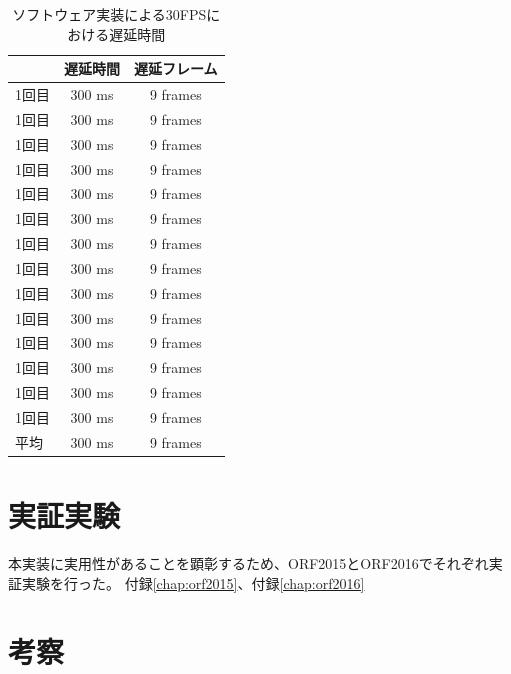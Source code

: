 \begin{table}[htbp]
  \caption{ソフトウェア実装による30FPSにおける遅延時間}
  \label{tb:pg235-vin-axi4-stream}
  \begin{center}
  \begin{tabular}{l|c|c}
    \hline
         & 遅延時間  & 遅延フレーム \\\hline\hline
    1回目 & 300 ms  & 9 frames \\\hline
    1回目 & 300 ms  & 9 frames \\\hline
    1回目 & 300 ms  & 9 frames \\\hline
    1回目 & 300 ms  & 9 frames \\\hline
    1回目 & 300 ms  & 9 frames \\\hline
    1回目 & 300 ms  & 9 frames \\\hline
    1回目 & 300 ms  & 9 frames \\\hline
    1回目 & 300 ms  & 9 frames \\\hline
    1回目 & 300 ms  & 9 frames \\\hline
    1回目 & 300 ms  & 9 frames \\\hline
    1回目 & 300 ms  & 9 frames \\\hline
    1回目 & 300 ms  & 9 frames \\\hline
    1回目 & 300 ms  & 9 frames \\\hline
    1回目 & 300 ms  & 9 frames \\\hline\hline
    平均  & 300 ms  & 9 frames \\\hline
  \end{tabular}\end{center}
\end{table}

\section{実証実験}
本実装に実用性があることを顕彰するため、ORF2015とORF2016でそれぞれ実証実験を行った。
付録\ref{chap:orf2015}、付録\ref{chap:orf2016}

\section{考察}
